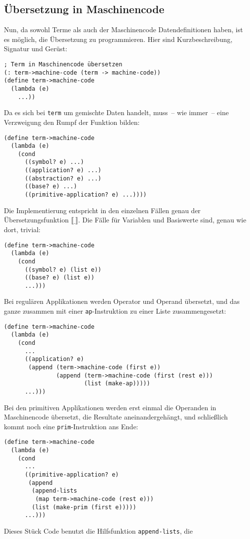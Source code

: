 \subsection{Übersetzung in Maschinencode}

Nun, da sowohl Terme als auch der Maschinencode Datendefinitionen
haben, ist es möglich, die Übersetzung zu programmieren.  Hier sind
Kurzbeschreibung, Signatur und Gerüst:
%
\begin{verbatim}
; Term in Maschinencode übersetzen
(: term->machine-code (term -> machine-code))
(define term->machine-code
  (lambda (e)
    ...))
\end{verbatim}
%
Da es sich bei \texttt{term} um gemischte Daten handelt, muss~-- wie
immer~-- eine Verzweigung den Rumpf der Funktion bilden:
%
\begin{verbatim}
(define term->machine-code
  (lambda (e)
    (cond
      ((symbol? e) ...)
      ((application? e) ...)
      ((abstraction? e) ...)
      ((base? e) ...)
      ((primitive-application? e) ...))))
\end{verbatim}
%
Die Implementierung entspricht in den einzelnen Fällen genau der
Übersetzungsfunktion $\llbracket\underline{~}\rrbracket$. Die Fälle
für Variablen und Basiswerte sind, genau wie dort, trivial:
%
\begin{verbatim}
(define term->machine-code
  (lambda (e)
    (cond
      ((symbol? e) (list e))
      ((base? e) (list e))
      ...)))
\end{verbatim}
%
Bei regulären Applikationen werden
Operator und Operand übersetzt, und das ganze zusammen mit einer
\texttt{ap}-Instruktion zu einer Liste zusammengesetzt:
%
\begin{verbatim}
(define term->machine-code
  (lambda (e)
    (cond
      ...
      ((application? e)
       (append (term->machine-code (first e))
               (append (term->machine-code (first (rest e)))
                       (list (make-ap)))))
      ...)))
\end{verbatim}
%
Bei den primitiven Applikationen werden erst einmal die Operanden in
Maschinencode übersetzt, die Resultate aneinandergehängt, und
schließlich kommt noch eine \texttt{prim}-Instruktion ans Ende:
%
\begin{verbatim}
(define term->machine-code
  (lambda (e)
    (cond
      ...
      ((primitive-application? e)
       (append
        (append-lists
         (map term->machine-code (rest e)))
        (list (make-prim (first e)))))
      ...)))
\end{verbatim}
%
Dieses Stück Code benutzt die Hilfsfunktion \texttt{append-lists}, die
